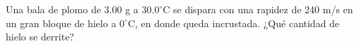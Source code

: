 \item Una bala de plomo de 3.00 g a $30.0^\circ\text{C}$ se dispara con una rapidez de 240 m/s en un gran bloque de hielo a $0^\circ\text{C}$, en donde queda incrustada. ¿Qué cantidad de hielo se derrite?
